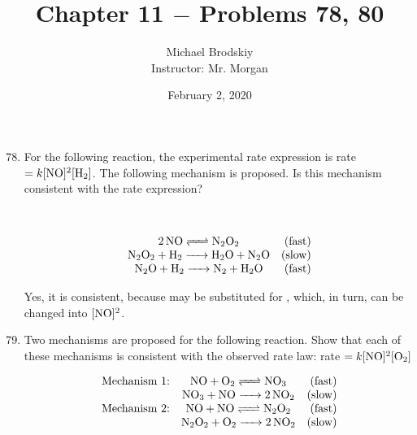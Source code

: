 \documentclass[12pt]{article}
\title{Chapter 11 $-$ Problems 78, 80}
\date{February 2, 2020}
\author{Michael Brodskiy\\ \small Instructor: Mr. Morgan}
\begin{document}
\maketitle

\begin{enumerate}

    \setcounter{enumi}{77}

  \item For the following reaction, the experimental rate expression is rate $=k[\ce{NO}]^2[\ce{H2}]$. The following mechanism is proposed. Is this mechanism consistent with the rate expression?

    \begin{center}
      \\
    \end{center}

    \begin{equation}
      \begin{array}{c r}
        \ce{2NO <=> N2O2} & \text{(fast)} \\
      \ce{N2O2 + H2 -> H2O + N2O} & \text{(slow)} \\
        \ce{N2O + H2 -> N2 + H2O} & \text{(fast)}
      \end{array}
      \label{1}
    \end{equation}

    \begin{center}
      Yes, it is consistent, because  may be substituted for , which, in turn, can be changed into $[\ce{NO}]^2$.
    \end{center}

    \setcounter{enumi}{79}

  \item Two mechanisms are proposed for the following reaction. Show that each of these mechanisms is consistent with the observed rate law: rate $=k[\ce{NO}]^2[\ce{O2}]$

    \begin{center}
    \end{center}

    \begin{equation}
      \begin{array}{l c r}
        \text{Mechanism 1:} & \ce{NO + O2 <=> NO3} & \text{(fast)}\\
        & \ce{NO3 + NO -> 2NO2} & \text{(slow)}\\
        \text{Mechanism 2:} & \ce{NO + NO <=> N2O2} & \text{(fast)}\\
        & \ce{N2O2 + O2 -> 2NO2} & \text{(slow)}\\
      \end{array}
      \label{2}
    \end{equation}


\end{enumerate}
\end{document}
